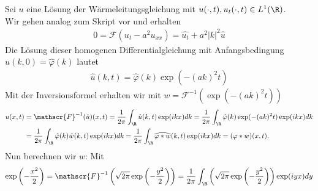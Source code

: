 \begin{solution}

Sei $u$ eine Lösung der Wärmeleitungsgleichung mit $u(\cdot,t), u_t(\cdot,t) \in L^1(\R)$. \\
Wir gehen analog zum Skript vor und erhalten
\begin{align*}
0 = \mathscr{F}(u_t - a^2u_{xx}) = \hat{u_t} + a^2|k|^2\hat{u}
\end{align*}
Die Lösung dieser homogenen Differentialgleichung mit Anfangsbedingung $\hat{u}(k,0) = \hat{\varphi}(k)$ lautet
\begin{align*}
  \hat{u}(k,t) = \hat{\varphi}(k)\exp(-(ak)^2t)
\end{align*}
Mit der Inversionsformel erhalten wir mit $w = \mathscr{F}^{-1}(\exp(-(ak)^2t))$
\begin{align*}
  u(x,t) &= \mathscr{F}^{-1}(\hat{u})(x,t) = \frac{1}{2\pi}\int_\R \hat{u}(k,t)\exp(ikx)dk
  = \frac{1}{2\pi}\int_\R \hat{\varphi}(k)\exp(-(ak)^2t)\exp(ikx)dk \\
  &= \frac{1}{2\pi}\int_\R \hat{\varphi}(k)\hat{w}(k,t)\exp(ikx)dk
  = \frac{1}{2\pi}\int_\R \widehat{\varphi \ast w}(k,t)\exp(ikx)dk
  = (\varphi \ast w)(x,t).
\end{align*}
Nun berechnen wir $w$: Mit
\begin{align*}
  \exp\left(-\frac{x^2}{2}\right) = \mathscr{F}^{-1}\left(\sqrt{2\pi}\exp\left(-\frac{y^2}{2}\right)\right)
  = \frac{1}{2\pi}\int_\R \left(\sqrt{2\pi}\exp\left(-\frac{y^2}{2}\right)\right)\exp(iyx) dy
\end{align*}


\end{solution}
